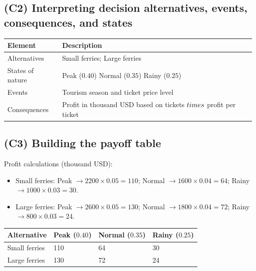 \documentclass[11pt]{article}
\begin{document}
	\subsection*{(C2) Interpreting decision alternatives, events, consequences, and states}
	
	\hypertarget{problem7-c2}{}
	
	\begin{center}
		\begin{tabular}{ll}
			\toprule
			Element & Description \\
			\midrule
			Alternatives & Small ferries; Large ferries \\
			States of nature & Peak
			($0.40$)
			Normal
			($0.35$)
			Rainy
			($0.25$) \\
			Events & Tourism season and ticket price level \\
			Consequences & Profit in thousand USD based on tickets $\\times$ profit per ticket \\
			\bottomrule
		\end{tabular}
	\end{center}
	
	\subsection*{(C3) Building the payoff table}
	
	\hypertarget{problem7-c3}{}
	
	Profit calculations (thousand USD):
	\begin{itemize}
		\item Small ferries: Peak $\to 2200 \times 0.05 = 110$; Normal $\to 1600 \times 0.04 = 64$; Rainy $\to 1000 \times 0.03 = 30$.
		\item Large ferries: Peak $\to 2600 \times 0.05 = 130$; Normal $\to 1800 \times 0.04 = 72$; Rainy $\to 800 \times 0.03 = 24$.
	\end{itemize}
	\begin{center}
		\begin{tabular}{llll}
			\toprule
			Alternative & Peak
			($0.40$) & Normal
			($0.35$) & Rainy
			($0.25$) \\
			\midrule
			Small ferries & 110 & 64 & 30 \\
			Large ferries & 130 & 72 & 24 \\
			\bottomrule
		\end{tabular}
	\end{center}
	
\end{document}
